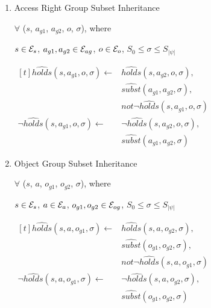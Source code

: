 \documentclass[11pt, twocolumn]{article}
\begin{document}
\begin{enumerate}
              \item
                Access Right Group Subset Inheritance

                $\forall$ ($s$, $a_{g1}$, $a_{g2}$, $o$, $\sigma$), where

                $s \in {\cal E}_{s}$,
                $a_{g1}, a_{g2} \in {\cal E}_{ag}$,
                $o \in {\cal E}_{o}$,
                $S_{0} \leq \sigma \leq S_{|\psi|}$

                \begin{math}
                  \begin{aligned}[t]
                    \hat{holds}(s, a_{g1}, o, \sigma) \leftarrow &
                    \hat{holds}(s, a_{g2}, o, \sigma), \\
                    & \hat{subst}(a_{g1}, a_{g2}, \sigma), \\
                    & not \lnot \hat{holds}(s, a_{g1}, o, \sigma) \\
                    \lnot \hat{holds}(s, a_{g1}, o, \sigma) \leftarrow &
                    \lnot \hat{holds}(s, a_{g2}, o, \sigma), \\
                    & \hat{subst}(a_{g1}, a_{g2}, \sigma)
                  \end{aligned}
                \end{math}

              \item
                Object Group Subset Inheritance

                $\forall$ ($s$, $a$, $o_{g1}$, $o_{g2}$, $\sigma$), where

                $s \in {\cal E}_{s}$,
                $a \in {\cal E}_{a}$,
                $o_{g1}, o_{g2} \in {\cal E}_{og}$,
                $S_{0} \leq \sigma \leq S_{|\psi|}$

                \begin{math}
                  \begin{aligned}[t]
                    \hat{holds}(s, a, o_{g1}, \sigma) \leftarrow &
                    \hat{holds}(s, a, o_{g2}, \sigma), \\
                    & \hat{subst}(o_{g1}, o_{g2}, \sigma), \\
                    & not \lnot \hat{holds}(s, a, o_{g1}, \sigma) \\
                    \lnot \hat{holds}(s, a, o_{g1}, \sigma) \leftarrow &
                    \lnot \hat{holds}(s, a, o_{g2}, \sigma), \\
                    & \hat{subst}(o_{g1}, o_{g2}, \sigma)
                  \end{aligned}
                \end{math}
            \end{enumerate}
\end{document}
